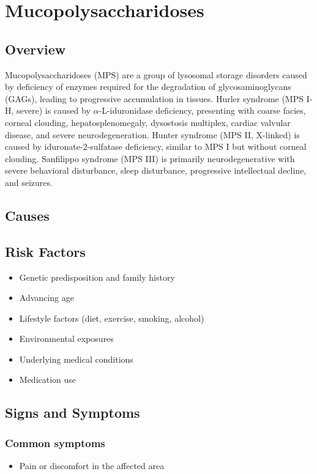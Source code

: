 \chapter{Mucopolysaccharidoses}
\label{sec:Mucopolysaccharidoses}

\section{Overview}
Mucopolysaccharidoses (MPS) are a group of lysosomal storage disorders caused by deficiency of enzymes required for the degradation of glycosaminoglycans (GAGs), leading to progressive accumulation in tissues. Hurler syndrome (MPS I-H, severe) is caused by $\alpha$-L-iduronidase deficiency, presenting with coarse facies, corneal clouding, hepatosplenomegaly, dysostosis multiplex, cardiac valvular disease, and severe neurodegeneration. Hunter syndrome (MPS II, X-linked) is caused by iduronate-2-sulfatase deficiency, similar to MPS I but without corneal clouding. Sanfilippo syndrome (MPS III) is primarily neurodegenerative with severe behavioral disturbance, sleep disturbance, progressive intellectual decline, and seizures.
\section{Causes}
\section{Risk Factors}

\begin{itemize}[noitemsep]
  \item Genetic predisposition and family history
  \item Advancing age
  \item Lifestyle factors (diet, exercise, smoking, alcohol)
  \item Environmental exposures
  \item Underlying medical conditions
  \item Medication use
\end{itemize}
\section{Signs and Symptoms}

\subsection{Common symptoms}
\begin{itemize}[noitemsep]
  \item Pain or discomfort in the affected area
  \end{itemize}

